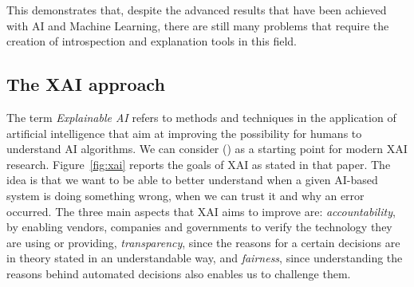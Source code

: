 \documentclass[conference]{IEEEtran}
\begin{document}
This demonstrates that, despite the advanced results that have been achieved
with AI and Machine Learning, there are still many problems that require the
creation of introspection and explanation tools in this field.







\subsection{The XAI approach}
\label{sec:xai}

The term \textit{Explainable AI} refers to methods and techniques in the
application of artificial intelligence that aim at improving the possibility for
humans to understand AI algorithms. We can consider (\cite{DARPA}) as a starting
point for modern XAI research. Figure~\ref{fig:xai} reports the goals of XAI as
stated in that paper. The idea is that we want to be able to better understand
when a given AI-based system is doing something wrong, when we can trust it and
why an error occurred. The three main aspects that XAI aims to improve are:
\textit{accountability}, by enabling vendors, companies and governments to verify the technology they are using or providing, \textit{transparency}, since the reasons for a certain decisions
are in theory stated in an understandable way, and \textit{fairness}, since
understanding the reasons behind automated decisions also enables us to challenge them.
\end{document}
